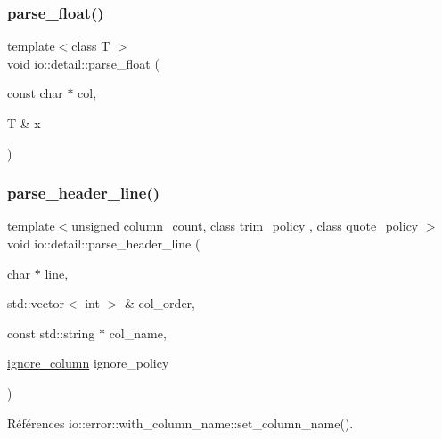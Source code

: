 \mbox{\label{namespaceio_1_1detail_a4f2b98902e1a5278853786aa8582df93}} 
\subsubsection{\texorpdfstring{parse\+\_\+float()}{parse\_float()}}
{\footnotesize\ttfamily template$<$class T $>$ \\
void io\+::detail\+::parse\+\_\+float (\begin{DoxyParamCaption}\item[{const char $\ast$}]{col,  }\item[{T \&}]{x }\end{DoxyParamCaption})}

\mbox{\label{namespaceio_1_1detail_a29aee32eb931073ca832933c7ed7cf51}} 
\subsubsection{\texorpdfstring{parse\+\_\+header\+\_\+line()}{parse\_header\_line()}}
{\footnotesize\ttfamily template$<$unsigned column\+\_\+count, class trim\+\_\+policy , class quote\+\_\+policy $>$ \\
void io\+::detail\+::parse\+\_\+header\+\_\+line (\begin{DoxyParamCaption}\item[{char $\ast$}]{line,  }\item[{std\+::vector$<$ int $>$ \&}]{col\+\_\+order,  }\item[{const std\+::string $\ast$}]{col\+\_\+name,  }\item[{\hyperlink{namespaceio_a544bc96f3a6bf086cb82e599be1a8ebc}{ignore\+\_\+column}}]{ignore\+\_\+policy }\end{DoxyParamCaption})}



Références io\+::error\+::with\+\_\+column\+\_\+name\+::set\+\_\+column\+\_\+name().

\mbox{\label{namespaceio_1_1detail_af7113f75d17577c3964d5d45fef65d43}} 
